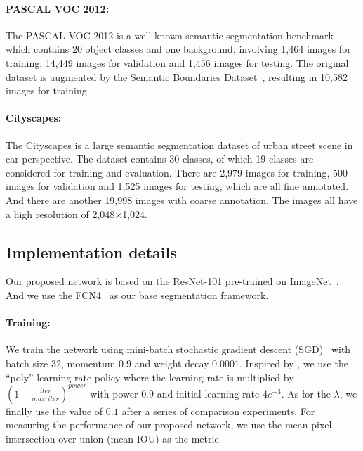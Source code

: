 \documentclass[10pt,twocolumn,letterpaper]{article}
\begin{document}
\vspace{-2ex}    
\paragraph{PASCAL VOC 2012:} The PASCAL VOC 2012 is a well-known semantic segmentation benchmark which contains 20 object classes and one background, involving 1,464 images for training, 14,449 images for validation and 1,456 images for testing. The original dataset is augmented by the Semantic Boundaries Dataset~\cite{Hariharan-SBD-2011}, resulting in 10,582 images for training. 

\vspace{-2ex}
\paragraph{Cityscapes:} The Cityscapes is a large semantic segmentation dataset of urban street scene in car perspective. The dataset contains 30 classes, of which 19 classes are considered for training and evaluation. There are 2,979 images for training, 500 images for validation and 1,525 images for testing, which are all fine annotated. And there are another 19,998 images with coarse annotation. The images all have a high resolution of 2,048$\times$1,024.

\subsection{Implementation details}

Our proposed network is based on the ResNet-101 pre-trained on Image{N}et~\cite{ILSVRC15}. And we use the FCN4~\cite{Long-CVPR-FCN-2015, Xie-ICCV-HEAD-2015} as our base segmentation framework.

\vspace{-2ex}    
\paragraph{Training:} We train the network using mini-batch stochastic gradient descent (SGD)~\cite{Krizhevsky-NIPS-Imagenet} with batch size $32$, momentum $0.9$ and weight decay $0.0001$. Inspired by \cite{Chen-Arxiv-Deeplabv2-2016, Liu-ICLR-ParseNet-2016}, we use the ``poly'' learning rate policy where the learning rate is multiplied by $\left(1- \frac{iter}{max\_iter}\right)^{power}$ with power $0.9$ and initial learning rate $4e^{-3}$. As for the $\lambda$, we finally use the value of $0.1$ after a series of comparison experiments. For measuring the performance of our proposed network, we use the mean pixel intersection-over-union (mean IOU) as the metric. 
\end{document}
